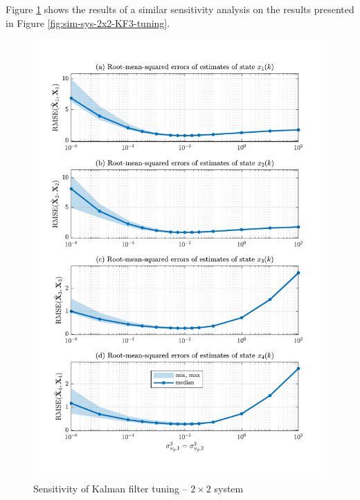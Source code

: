 Figure \ref{fig:sim-sys-2x2-KF3-tuning-sens} shows the results of a similar sensitivity analysis on the results presented in Figure \ref{fig:sim-sys-2x2-KF3-tuning}.

\begin{figure}[htp]
	\centering
	\includegraphics[width=14cm]{images/rod_obs_sim3_3KF_Q_statplot.pdf}
	\caption{Sensitivity of Kalman filter tuning – $2\times2$ system}
	\label{fig:sim-sys-2x2-KF3-tuning-sens}
\end{figure}

